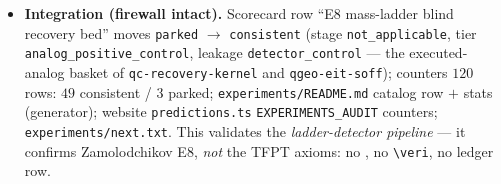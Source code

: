 \begin{itemize}[leftmargin=1.5em]
\item \textbf{Integration (firewall intact).} Scorecard row ``E8 mass-ladder blind recovery bed'' moves
\texttt{parked} $\to$ \texttt{consistent} (stage \texttt{not\_applicable}, tier
\texttt{analog\_positive\_control}, leakage \texttt{detector\_control} --- the executed-analog basket
of \texttt{qc-recovery-kernel} and \texttt{qgeo-eit-soff});
counters $120$ rows: $49$ consistent / $3$ parked; \texttt{experiments/README.md} catalog row $+$ stats
(generator); website \texttt{predictions.ts} \texttt{EXPERIMENTS\_AUDIT} counters;
\texttt{experiments/next.txt}. This validates the \emph{ladder-detector pipeline} --- it confirms
Zamolodchikov E8, \emph{not} the TFPT axioms: no \mE, no \texttt{\textbackslash veri}, no ledger row.
\end{itemize}

